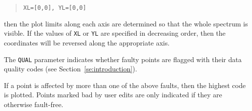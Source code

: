 {{   \begin {quote}
      \verb+XL=[0,0], YL=[0,0]+
   \end {quote}
   then the plot limits along each axis are determined so that the whole
   spectrum is visible.
   If the values of \verb+XL+ or \verb+YL+ are specified in decreasing order,
   then the coordinates will be reversed along the appropriate axis.

   The \verb+QUAL+ parameter indicates whether faulty points are flagged with
   their data quality codes (see Section~\ref{se:introduction}).

   If a point is affected by more than one of the above faults, then
   the highest code is plotted.
   Points marked bad by user edits are only indicated if they are otherwise
   fault-free.
}
}

